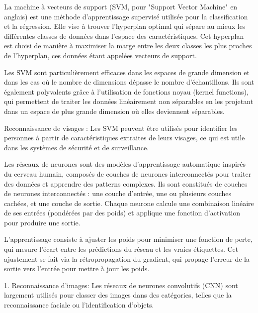 \documentclass[a4paper,12pt]{article}
\begin{document}
        La machine à vecteurs de support (SVM, pour "Support Vector Machine" en anglais) est une méthode d'apprentissage supervisé utilisée pour la classification et la régression. Elle vise à trouver l'hyperplan optimal qui sépare au mieux les différentes classes de données dans l'espace des caractéristiques. Cet hyperplan est choisi de manière à maximiser la marge entre les deux classes les plus proches de l'hyperplan, ces données étant appelées vecteurs de support.
        
        Les SVM sont particulièrement efficaces dans les espaces de grande dimension et dans les cas où le nombre de dimensions dépasse le nombre d'échantillons. Ils sont également polyvalents grâce à l'utilisation de fonctions noyau (kernel functions), qui permettent de traiter les données linéairement non séparables en les projetant dans un espace de plus grande dimension où elles deviennent séparables.
        
        
        Reconnaissance de visages : Les SVM peuvent être utilisés pour identifier les personnes à partir de caractéristiques extraites de leurs visages, ce qui est utile dans les systèmes de sécurité et de surveillance.
        
        Les réseaux de neurones sont des modèles d’apprentissage automatique inspirés du cerveau humain, composés de couches de neurones interconnectés pour traiter des données et apprendre des patterns complexes.
        Ils sont constitués de couches de neurones interconnectés : une couche d’entrée, une ou plusieurs couches cachées, et une couche de sortie. Chaque neurone calcule une combinaison linéaire de ses entrées (pondérées par des poids) et applique une fonction d’activation pour produire une sortie.

        L’apprentissage consiste à ajuster les poids pour minimiser une fonction de perte, qui mesure l’écart entre les prédictions du réseau et les vraies étiquettes. Cet ajustement se fait via la rétropropagation du gradient, qui propage l’erreur de la sortie vers l’entrée pour mettre à jour les poids.


        1. Reconnaissance d'images: Les réseaux de neurones convolutifs (CNN) sont largement utilisés pour classer des images dans des catégories, telles que la reconnaissance faciale ou l'identification d'objets.
        
\end{document}
